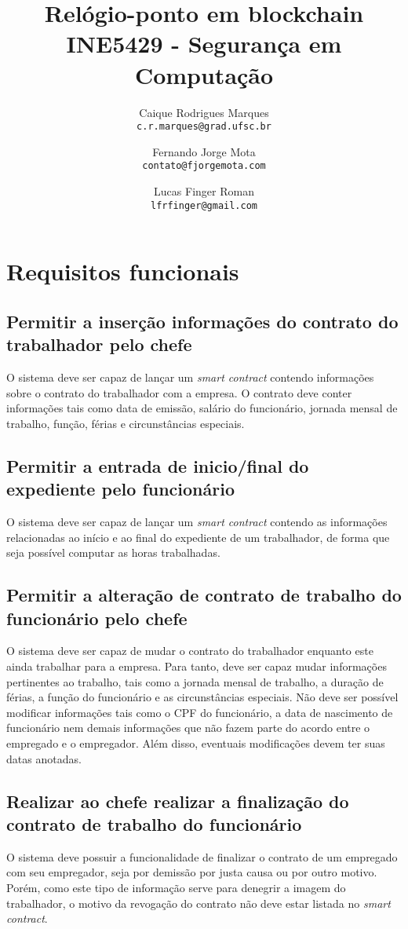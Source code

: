 \documentclass{article}
\title{\textbf{Relógio-ponto em blockchain \\
        \large INE5429 - Segurança em Computação}}
\author{
    Caique Rodrigues Marques \\
    {\texttt{c.r.marques@grad.ufsc.br}}
    \and
    Fernando Jorge Mota \\
    {\texttt{contato@fjorgemota.com}}
    \and
    Lucas Finger Roman \\
    {\texttt{lfrfinger@gmail.com}}
}
\date{}
\begin{document}
\maketitle
\tableofcontents{}
\section{Requisitos funcionais}

\subsection{Permitir a inserção informações do contrato do trabalhador pelo chefe}
O sistema deve ser capaz de lançar um \textit{smart contract} contendo
informações sobre o contrato do trabalhador com a empresa. O contrato deve
conter informações tais como data de emissão, salário do funcionário, jornada
mensal de trabalho, função, férias e circunstâncias especiais.

\subsection{Permitir a entrada de inicio/final do expediente pelo funcionário}
O sistema deve ser capaz de lançar um \textit{smart contract} contendo as
informações relacionadas ao início e ao final do expediente de um trabalhador,
de forma que seja possível computar as horas trabalhadas.

\subsection{Permitir a alteração de contrato de trabalho do funcionário pelo chefe}
O sistema deve ser capaz de mudar o contrato do trabalhador enquanto este
ainda trabalhar para a empresa. Para tanto, deve ser capaz mudar informações
pertinentes ao trabalho, tais como a jornada mensal de trabalho, a duração de férias,
a função do funcionário e as circunstâncias especiais. Não deve ser possível modificar
informações tais como o CPF do funcionário, a data de nascimento de funcionário
nem demais informações que não fazem parte do acordo entre o empregado e o
empregador. Além disso, eventuais modificações devem ter suas datas anotadas.

\subsection{Realizar ao chefe realizar a finalização do contrato de trabalho do funcionário}
O sistema deve possuir a funcionalidade de finalizar o contrato de um empregado
com seu empregador, seja por demissão por justa causa ou por outro motivo.
Porém, como este tipo de informação serve para denegrir a imagem do trabalhador,
o motivo da revogação do contrato não deve estar listada no \textit{smart contract}.
\end{document}
